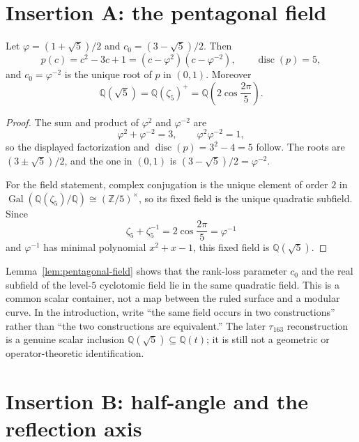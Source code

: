 
\section*{Insertion A: the pentagonal field}

\begin{lemma}\label{lem:pentagonal-field}
Let \(\varphi=(1+\sqrt5)/2\) and \(c_0=(3-\sqrt5)/2\). Then
\[
p(c)=c^2-3c+1=(c-\varphi^2)(c-\varphi^{-2}),
\qquad \operatorname{disc}(p)=5,
\]
and \(c_0=\varphi^{-2}\) is the unique root of \(p\) in \((0,1)\). Moreover
\[
\mathbb Q(\sqrt5)=\mathbb Q(\zeta_5)^+
=\mathbb Q\!\left(2\cos\frac{2\pi}{5}\right).
\]
\end{lemma}

\begin{proof}
The sum and product of \(\varphi^2\) and \(\varphi^{-2}\) are
\[
\varphi^2+\varphi^{-2}=3,\qquad \varphi^2\varphi^{-2}=1,
\]
so the displayed factorization and \(\operatorname{disc}(p)=3^2-4=5\) follow. The roots are \((3\pm\sqrt5)/2\), and the one in \((0,1)\) is \((3-\sqrt5)/2=\varphi^{-2}\).

For the field statement, complex conjugation is the unique element of order \(2\) in
\(\operatorname{Gal}(\mathbb Q(\zeta_5)/\mathbb Q)\cong(\mathbb Z/5)^\times\), so its fixed field is the unique quadratic subfield. Since
\[
\zeta_5+\zeta_5^{-1}=2\cos\frac{2\pi}{5}=\varphi^{-1}
\]
and \(\varphi^{-1}\) has minimal polynomial \(x^2+x-1\), this fixed field is \(\mathbb Q(\sqrt5)\).
\end{proof}

\begin{remark}\label{rem:shared-field}
Lemma~\ref{lem:pentagonal-field} shows that the rank-loss parameter \(c_0\) and the real subfield of the level-\(5\) cyclotomic field lie in the same quadratic field. This is a common scalar container, not a map between the ruled surface and a modular curve. In the introduction, write ``the same field occurs in two constructions'' rather than ``the two constructions are equivalent.'' The later \(\tau_{163}\) reconstruction is a genuine scalar inclusion \(\mathbb Q(\sqrt5)\subseteq\mathbb Q(t)\); it is still not a geometric or operator-theoretic identification.
\end{remark}

\section*{Insertion B: half-angle and the reflection axis}

